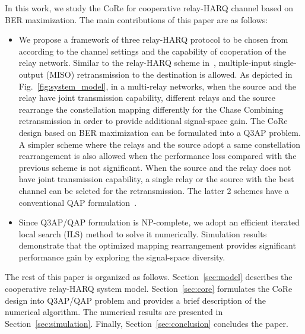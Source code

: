 \documentclass[conference]{IEEEtran}
\begin{document}
In this work, we study the CoRe for cooperative relay-HARQ channel based on BER
maximization. The main contributions of this paper are as follows:
\begin{itemize}
    \item We propose a framework of three relay-HARQ protocol
    to be chosen from according to the channel settings and the
    capability of cooperation of the relay network. Similar to the relay-HARQ
    scheme in~\cite{qi2011h2arq}, multiple-input single-output (MISO)
    retransmission to the destination is allowed. As depicted in
    Fig.~\ref{fig:system_model}, in a multi-relay networks, when the source and
    the relay have joint transmission capability, different relays and the
    source rearrange the constellation mapping differently for the Chase
    Combining retransmission in order to provide additional signal-space gain.
    The CoRe design based on BER maximization can be formulated into a Q3AP
    problem. A simpler scheme where the relays and the source adopt a same constellation
    rearrangement is also allowed when the performance loss compared with the
    previous scheme is not significant. When the source and
    the relay does not have joint transmission capability, a single relay or the
    source with the best channel can be seleted for the retransmission. The
    latter 2 schemes have a conventional QAP
    formulation~\cite{harvind2005symbol}.
    
    \item Since Q3AP/QAP formulation is NP-complete, we adopt an efficient
    iterated local search (ILS) method to solve it numerically. Simulation
    results demonstrate that the optimized mapping rearrangement provides
    significant performance gain by exploring the signal-space diversity.
\end{itemize}


The rest of this paper is organized as follows. Section~\ref{sec:model}
describes the cooperative relay-HARQ system model. Section~\ref{sec:core}
formulates the CoRe design into Q3AP/QAP problem and provides a brief
description of the numerical algorithm. The numerical results are presented in
Section~\ref{sec:simulation}. Finally, Section~\ref{sec:conclusion} concludes
the paper.
\end{document}
